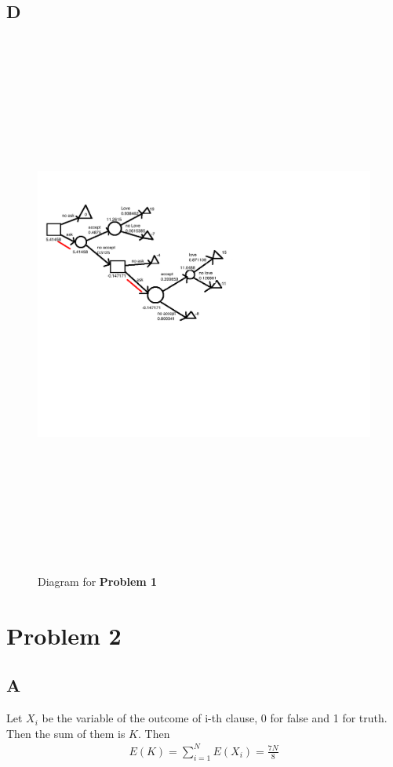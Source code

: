 \documentclass[11pt]{article}
\begin{document}
	\subsection*{D}
	\begin{figure}[!htbp]
		\centering 
		\includegraphics[height=18cm ,width=20cm]{Untitled.png}
		\caption{Diagram for \textbf{Problem 1}} \label{figure7}
	\end{figure}
	\section*{Problem 2}
	\subsection*{A}
	Let $ X_i $ be the variable of the outcome of i-th clause, 0 for false and 1 for truth. Then the sum of them is $ K $. Then
	\begin{align*}
		E(K) = \sum_{i=1}^{N}E(X_i) = \frac{7N}{8}
	\end{align*}
\end{document}
